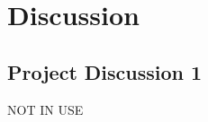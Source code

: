 \section{Discussion}\label{sec:Discussion}

\subsection{Project Discussion 1}\label{sec:project discussion}

NOT IN USE